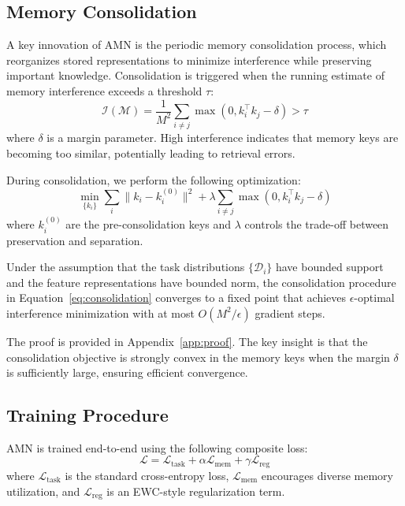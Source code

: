\documentclass[11pt]{article}
\begin{document}
\subsection{Memory Consolidation}
\label{sec:consolidation}

A key innovation of AMN is the periodic memory consolidation process, which reorganizes stored representations to minimize interference while preserving important knowledge. Consolidation is triggered when the running estimate of memory interference exceeds a threshold $\tau$:
\begin{equation}
    \mathcal{I}(\mathcal{M}) = \frac{1}{M^2} \sum_{i \neq j} \max(0, k_i^\top k_j - \delta) > \tau
\end{equation}
where $\delta$ is a margin parameter. High interference indicates that memory keys are becoming too similar, potentially leading to retrieval errors.

During consolidation, we perform the following optimization:
\begin{equation}
    \min_{\{k_i\}} \sum_{i} \|k_i - k_i^{(0)}\|^2 + \lambda \sum_{i \neq j} \max(0, k_i^\top k_j - \delta)
    \label{eq:consolidation}
\end{equation}
where $k_i^{(0)}$ are the pre-consolidation keys and $\lambda$ controls the trade-off between preservation and separation.

\begin{theorem}
\label{thm:convergence}
Under the assumption that the task distributions $\{\mathcal{D}_i\}$ have bounded support and the feature representations have bounded norm, the consolidation procedure in Equation~\ref{eq:consolidation} converges to a fixed point that achieves $\epsilon$-optimal interference minimization with at most $O(M^2 / \epsilon)$ gradient steps.
\end{theorem}

The proof is provided in Appendix~\ref{app:proof}. The key insight is that the consolidation objective is strongly convex in the memory keys when the margin $\delta$ is sufficiently large, ensuring efficient convergence.

\subsection{Training Procedure}

AMN is trained end-to-end using the following composite loss:
\begin{equation}
    \mathcal{L} = \mathcal{L}_{\text{task}} + \alpha \mathcal{L}_{\text{mem}} + \gamma \mathcal{L}_{\text{reg}}
\end{equation}
where $\mathcal{L}_{\text{task}}$ is the standard cross-entropy loss, $\mathcal{L}_{\text{mem}}$ encourages diverse memory utilization, and $\mathcal{L}_{\text{reg}}$ is an EWC-style regularization term.
\end{document}
